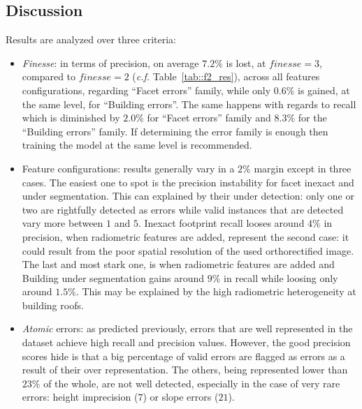 \documentclass[runningheads]{llncs}
\begin{document}
\subsection{Discussion}

Results are analyzed over three criteria:
\begin{itemize}
	\item \textit{Finesse}: in terms of precision, on average $7.2\%$ is lost, at $\textit{finesse} = 3$, compared to $\textit{finesse} = 2$ (\textit{c.f.} Table~\ref{tab::f2_res}), across all features configurations, regarding ``Facet errors'' family, while only $0.6\%$ is gained, at the same level, for ``Building errors''. The same happens with regards to recall which is diminished by $2.0\%$ for ``Facet errors'' family and $8.3\%$ for the ``Building errors'' family. If determining the error family is enough then training the model at the same level is recommended.
    \item Feature configurations: results generally vary in a $2\%$ margin except in three cases. The easiest one to spot is the precision instability for facet inexact and under segmentation. This can explained by their under detection: only one or two are rightfully detected as errors while valid instances that are detected vary more between $1$ and $5$. Inexact footprint recall looses around $4\%$ in precision, when radiometric features are added, represent the second case: it could result from the poor spatial resolution of the used orthorectified image. The last and most stark one, is when radiometric features are added and Building under segmentation gains around $9\%$ in recall while loosing only around $1.5\%$. This may be explained by the high radiometric heterogeneity at building roofs.
    \item \textit{Atomic} errors: as predicted previously, errors that are well represented in the dataset achieve high recall and precision values. However, the good precision scores hide is that a big percentage of valid errors are flagged as errors as a result of their over representation. The others, being represented lower than $23\%$ of the whole, are not well detected, especially in the case of very rare errors: height imprecision ($7$) or slope errors ($21$).
\end{itemize}
\end{document}
